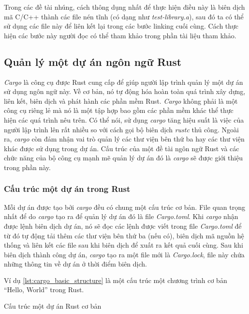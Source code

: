 Trong các đề tài nhúng, cách thông dụng nhất để thực hiện điều này là biên dịch mã C/C++ thành các file nén tĩnh (có dạng như \emph{test-library.a}), sau đó ta có thể sử dụng các file này để liên kết lại trong các bước linking cuối cùng.
Cách thực hiện các bước này người đọc có thể tham khảo trong phần tài liệu tham khảo.

\subsection{Quản lý một dự án ngôn ngữ Rust}
\emph{Cargo} là công cụ được Rust cung cấp để giúp người lập trình quản lý một dự án sử dụng ngôn ngữ này.
Về cơ bản, nó tự động hóa hoàn toàn quá trình xây dựng, liên kết, biên dịch và phát hành các phần mềm Rust.
\emph{Cargo} không phải là một công cụ riêng lẻ mà nó là một tập hợp bao gồm các phần mềm khác thể thực hiện các quá trình nêu trên.
Có thể nói, sử dụng \emph{cargo} tăng hiệu suất là việc của người lập trình lên rất nhiều so với cách gọi bộ biên dịch \emph{rustc} thủ công.
Ngoài ra, \emph{cargo} còn đảm nhận vai trò quản lý các thư viện bên thứ ba hay các thư viện khác được sử dụng trong dự án.
Cấu trúc của một đề tài ngôn ngữ Rust và các chức năng của bộ công cụ mạnh mẽ quản lý dự án đó là \emph{cargo} sẽ được giới thiệu trong phần này.

\subsubsection{Cấu trúc một dự án trong Rust}
Mỗi dự án được tạo bởi \emph{cargo} đều có chung một cấu trúc cơ bản.
File quan trọng nhất để do \emph{cargo} tạo ra để quản lý dự án đó là file \emph{Cargo.toml}.
Khi \emph{cargo} nhận được lệnh biên dịch dự án, nó sẽ đọc các lệnh được viết trong file \emph{Cargo.toml} để từ đó tự động tải thêm các thư viện bên thứ ba (nếu có), biên dịch mã nguồn hệ thống và liên kết các file sau khi biên dịch để xuất ra kết quả cuối cùng.
Sau khi biên dịch thành công dự án, \emph{cargo} tạo ra một file mới là \emph{Cargo.lock}, file này chứa những thông tin về dự án ở thời điểm biên dịch.

Ví dụ \ref{lst:cargo_basic_structure} là một cấu trúc một chương trình cơ bản ``Hello, World'' trong Rust.
\begin{listing}
\caption{Cấu trúc một dự án Rust cơ bản}
\label{lst:cargo_basic_structure}
\end{listing}

